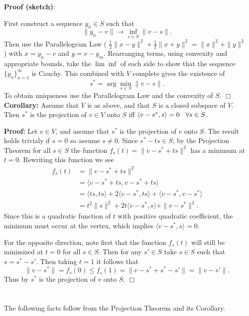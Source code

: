 \documentclass[12pt,oneside]{article}
\begin{document}
\textbf{Proof (sketch)}: 
 
 First construct a sequence \(y_n \in S\) such that 
\[\| y_n-v\| \to \inf\limits_{s\in S} \|v-s\|.\] 
Then use the Parallelogram Law ( \( \frac{1}{2} \|x-y\|^2 +\frac{1}{2} \|x+y\|^2=\|x\|^2+\|y\|^2 \) ) with \(x=y_n -v\) and \(y=v-y_m\). Rearranging terms, using convexity and appropriate bounds, take the \( \lim\inf \) of each side to show that the sequence \( \{y_n\}_{n=1}^{\infty} \) is Cauchy. This combined with \(V\) complete gives the existence of 
\[
s^*=\arg\min\limits_{s\in S} \|v-s\|.
\]
To obtain uniqueness use the Parallelogram Law and the convexity of \(S\).    \(\Box\)\\

\noindent \textbf{Corollary:} Assume that \(V\) is as above, and that \( S \) is a closed subspace of \(V\). Then \( s^* \) is the projection of \( v \in V\) onto \(S\) iff \(\langle v-s^*, s \rangle =0  \hspace{3mm}\forall s \in S \). 

\textbf{Proof:} Let \(v\in V\), and assume that \( s^*\) is the projection of \(v\) onto \(S\). The result holds trivialy if \(s=0\) so assume \(s\ne 0\). Since $s^*-ts\in S$, by the Projection Theorem for all \(s\in S\) the function \( f_s(t) = \| v-s^*+ts\|^2 \) has a minimum at \(t=0\). Rewriting this function we see 
\begin{align*}
 f_s(t) & = \| v-s^*+ts\|^2 \\
& = \langle v-s^*+ts, v-s^*+ts \rangle \\
& = \langle ts,ts \rangle + 2 \langle v-s^*,ts \rangle + \langle v-s^*,v-s^* \rangle \\
&=t^2 \|s\|^2 + 2t \langle v-s^*,s \rangle + \|v-s^*\|^2.
\end{align*} 
Since this is a quadratic function of \(t\) with positive quadratic coefficient, the minimum must occur at the vertex, which implies \(\langle v-s^*,s \rangle=0\). 

For the opposite direction, note first that the function \(f_s(t)\) will still be minimized at \(t=0\) for all \(s \in S\). Then for any \( s' \in S\) take \(s \in S \) such that \( s=s^*-s'\). Then taking \(t=1\) it follows that 
\[
\|v-s^*\|=f_s(0) \le f_s(1)=\|v-s^*+s^*-s'\|=\|v-s'\|.
\]
Thus by \(s^*\) is the projection of \(v\) onto  \(S\). \( \Box \) \\
\\~\\
The following facts follow from the Projection Theorem and its Corollary. 
\end{document}
